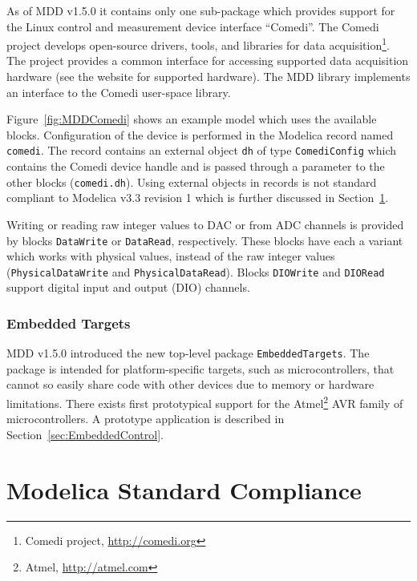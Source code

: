 \documentclass{resources/modelica}
\newcommand{\modelica}[1]{\lstinline[language=modelica]|#1|}
\newcommand{\BTHI}[1]{}
\begin{document}
\noindent
As of MDD v1.5.0 it contains only one sub-package which
provides support for the Linux control and measurement device interface
``Comedi''. The Comedi project develops open-source drivers, tools, and
libraries for data acquisition\footnote{Comedi project,
\url{http://comedi.org}}. The project provides a common interface for
accessing supported data acquisition hardware (see the website for supported
hardware). The MDD library implements an interface to the Comedi user-space
library.

Figure~\ref{fig:MDDComedi} shows an example model which uses the available
blocks. Configuration of the device is performed in the Modelica record named
\modelica{comedi}. The record contains an external object \modelica{dh} of type
\modelica{ComediConfig} which contains the Comedi device handle and is passed through
a parameter to the other blocks (\modelica{comedi.dh}). Using external
objects in records is not standard compliant to Modelica v3.3 revision 1
\citep{ModelicaAssociation2014} which is further discussed in
Section~\ref{sec:ModelicaStandardCompliance}.

Writing or reading raw integer values to DAC or from ADC channels is provided by
blocks \modelica{DataWrite} or \modelica{DataRead}, respectively. These blocks have
each a variant which works with physical values, instead of the raw integer
values  (\modelica{PhysicalDataWrite} and \modelica{PhysicalDataRead}).
Blocks \modelica{DIOWrite} and \modelica{DIORead} support digital input and
output (DIO) channels.

\subsubsection{Embedded Targets}
\label{sec:EmbeddedTargets}

MDD v1.5.0 introduced the new top-level package \modelica{EmbeddedTargets}. The
package is intended for platform-specific targets, such as microcontrollers,
that cannot so easily share code with other devices due to memory or hardware
limitations.
There exists first prototypical support for the
Atmel\footnote{Atmel, \url{http://atmel.com}} AVR family of
microcontrollers. A prototype application is described in
Section~\ref{sec:EmbeddedControl}.

\section{Modelica Standard Compliance}
\label{sec:ModelicaStandardCompliance}
\BTHI{TODO: Thomas, Bernhard}
\end{document}
